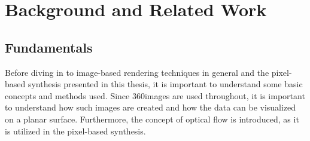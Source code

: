 \chapter{Background and Related Work}

%

\section{Fundamentals}
Before diving in to image-based rendering techniques in general and the pixel-based synthesis presented in this thesis, it is important to understand some basic concepts and methods used. Since 360\degree images are used throughout, it is important to understand how such images are created and how the data can be visualized on a planar surface. Furthermore, the concept of optical flow is introduced, as it is utilized in the pixel-based synthesis.


